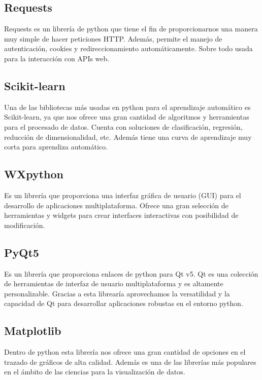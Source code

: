 \subsection{Requests}
Requests es un librería de python que tiene el fin de proporcionarnos una manera muy simple de hacer peticiones HTTP. Además, permite el manejo de autenticación, cookies y redireccionamiento automáticamente. Sobre todo usada para la interacción con APIs web.

\subsection{Scikit-learn}
Una de las bibliotecas más usadas en python para el aprendizaje automático es Scikit-learn, ya que nos ofrece una gran cantidad de algoritmos y herramientas para el procesado de datos. Cuenta con soluciones de clasificación, regresión, reducción de dimensionalidad, etc. Además tiene una curva de aprendizaje muy corta para aprendiza automático.

\subsection{WXpython}
Es un librería que proporciona una interfaz gráfica de usuario (GUI) para el desarrollo de aplicaciones multiplataforma. Ofrece una gran selección de herramientas y widgets para crear interfaces interactivas con posibilidad de modificación.

\subsection{PyQt5}
Es un librería que proporciona enlaces de python para Qt v5. Qt es una colección de herramientas de interfaz de usuario multiplataforma y es altamente personalizable. Gracias a esta librearía aprovechamos la versatilidad y la capacidad de Qt para desarrollar aplicaciones robustas en el entorno python.

\subsection{Matplotlib}
Dentro de python esta librería nos ofrece una gran cantidad de opciones en el trazado de gráficos de alta calidad. Además es una de las librerías más populares en el ámbito de las ciencias para la visualización de datos.

